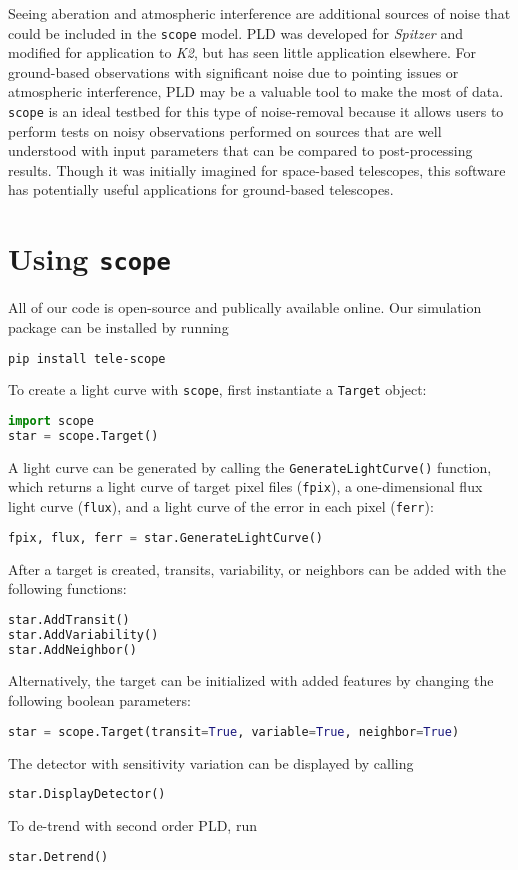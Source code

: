\documentclass[12pt,preprint]{aastex}
\begin{document}
Seeing aberation and atmospheric interference are additional sources of noise that could be included in the \texttt{scope} model. PLD was developed for \textit{Spitzer} and modified for application to \textit{K2}, but has seen little application elsewhere. For ground-based observations with significant noise due to pointing issues or atmospheric interference, PLD may be a valuable tool to make the most of data. \texttt{scope} is an ideal testbed for this type of noise-removal because it allows users to perform tests on noisy observations performed on sources that are well understood with input parameters that can be compared to post-processing results. Though it was initially imagined for space-based telescopes, this software has potentially useful applications for ground-based telescopes.

\section{Using \texttt{scope}}

All of our code is open-source and publically available online. Our simulation package can be installed by running
%
\begin{lstlisting}[language=bash]
pip install tele-scope
\end{lstlisting}
%
To create a light curve with \texttt{scope}, first instantiate a \texttt{Target} object:
%
\begin{lstlisting}[language=Python]
import scope
star = scope.Target()
\end{lstlisting}
%
A light curve can be generated by calling the \texttt{GenerateLightCurve()} function, which returns a light curve of target pixel files (\texttt{fpix}), a one-dimensional flux light curve (\texttt{flux}), and a light curve of the error in each pixel (\texttt{ferr}):
%
\begin{lstlisting}[language=Python]
fpix, flux, ferr = star.GenerateLightCurve()
\end{lstlisting}
%
After a target is created, transits, variability, or neighbors can be added with the following functions:
%
\begin{lstlisting}[language=Python]
star.AddTransit()
star.AddVariability()
star.AddNeighbor()
\end{lstlisting}
Alternatively, the target can be initialized with added features by changing the following boolean parameters:
%
\begin{lstlisting}[language=Python]
star = scope.Target(transit=True, variable=True, neighbor=True)
\end{lstlisting}
%
The detector with sensitivity variation can be displayed by calling
%
\begin{lstlisting}[language=Python]
star.DisplayDetector()
\end{lstlisting}
%
To de-trend with second order PLD, run
\begin{lstlisting}[language=Python]
star.Detrend()
\end{lstlisting}
\end{document}
